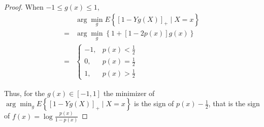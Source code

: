 \begin{proof}
    When $-1\leq g(x)\leq 1$,
    \begin{equation*}
        \begin{aligned}
              & \arg\min_{g}E\left\{\left[1-Yg(X)\right]_{+}\mid X=x\right\} \\
            = & \arg\min_{g}\left\{1+\left[1-2p(x)\right]g(x)\right\}        \\
            = & \left\{\begin{array}{ll}
                -1, & p(x)<\frac{1}{2} \\
                0,  & p(x)=\frac{1}{2} \\
                1,  & p(x)>\frac{1}{2}
            \end{array}\right.
        \end{aligned}
    \end{equation*}

    Thus, for the $g(x)\in\left[-1,1\right]$ the minimizer of $\arg\min_{g} E\left\{\left[1-Yg(X)\right]_{+}\mid X=x\right\}$ is the sign of $p(x)-\frac{1}{2}$, that is the sign of $f(x)=\log\frac{p(x)}{1-p(x)}$
\end{proof}